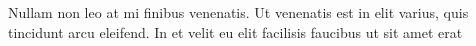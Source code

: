 \section*{}

\noindent
 Nullam non leo at mi finibus venenatis. Ut venenatis est in elit varius, quis tincidunt arcu eleifend. In et velit eu elit facilisis faucibus ut sit amet erat